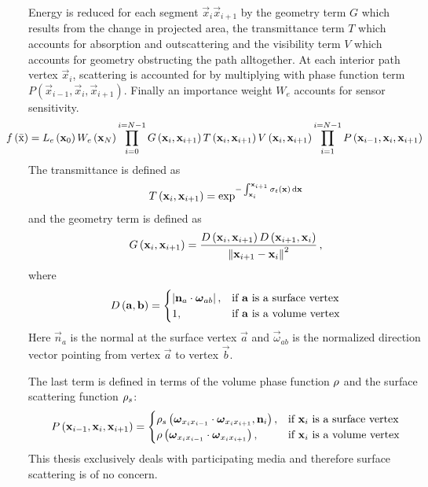 Energy is reduced for each segment $\vec{x}_i \vec{x}_{i+1}$ by the geometry term $G$ which results from the change in projected area, the transmittance term $T$ which accounts for absorption and outscattering and the visibility term $V$ which accounts for geometry obstructing the path alltogether. At each interior path vertex $\vec{x}_i$, scattering is accounted for by multiplying with phase function term $P(\vec{x}_{i-1}, \vec{x}_i, \vec{x}_{i+1})$. Finally an importance weight $W_e$ accounts for sensor sensitivity.
\begin{align}
\hspace{-.3in}
f\left(\bar{\mathrm{x}}\right) =
L_e\left(\vec{x}_0\right)
W_e\left(\vec{x}_N\right)
\prod_{i=0}^{i=N-1}
G\left(\vec{x}_i, \vec{x}_{i+1}\right)
T\left(\vec{x}_i, \vec{x}_{i+1}\right)
V\left(\vec{x}_i, \vec{x}_{i+1}\right)
\prod_{i=1}^{i=N-1}
P\left(\vec{x}_{i-1}, \vec{x}_i, \vec{x}_{i+1}\right)
\label{eq:foundations_mc_pathintegral}
\end{align}
The transmittance is defined as
\begin{align}
T\left(\boldsymbol{\mathbf{x}}_i, \boldsymbol{\mathbf{x}}_{i+1}\right) =
\operatorname{exp}^
{
    -\int_{\boldsymbol{\mathbf{x}}_i}^{\boldsymbol{\mathbf{x}}_{i+1}}\sigma_t\left(\boldsymbol{\mathbf{x}}\right)\,\mathrm{d}\boldsymbol{\mathbf{x}}
}
\end{align}
and the geometry term is defined as
\begin{align}
G\left(\boldsymbol{\mathbf{x}}_i, \boldsymbol{\mathbf{x}}_{i+1}\right) =
\frac{D\left(\boldsymbol{\mathbf{x}}_{i}, \boldsymbol{\mathbf{x}}_{i+1}\right)D\left(\boldsymbol{\mathbf{x}}_{i+1}, \boldsymbol{\mathbf{x}}_{i}\right)}{\left\lVert\boldsymbol{\mathbf{x}}_{i+1}-\boldsymbol{\mathbf{x}}_{i}\right\rVert^2} \,,
\end{align}
where
\begin{align}
D\left(\boldsymbol{\mathbf{a}}, \boldsymbol{\mathbf{b}}\right) =
\begin{cases}
\left\vert\boldsymbol{\mathbf{n}}_a\cdot\boldsymbol{\mathbf{\omega}}_{ab}\right\vert, & \text{if $\boldsymbol{\mathbf{a}}$ is a surface vertex}
\\
1, & \text{if $\boldsymbol{\mathbf{a}}$ is a volume vertex}
\end{cases}
\end{align}
Here $\vec{n}_a$ is the normal at the surface vertex $\vec{a}$ and $\vec{\omega}_{ab}$ is the normalized direction vector pointing from vertex $\vec{a}$ to vertex $\vec{b}$.

The last term is defined in terms of the volume phase function $\rho$ and the surface scattering function $\rho_s$:
\begin{align}
P\left(\boldsymbol{\mathbf{x}}_{i-1}, \boldsymbol{\mathbf{x}}_i, \boldsymbol{\mathbf{x}}_{i+1}\right) =
\begin{cases}
\rho_s\left(\boldsymbol{\mathbf{\omega}}_{x_ix_{i-1}}\cdot\boldsymbol{\mathbf{\omega}}_{x_ix_{i+1}}, \boldsymbol{\mathbf{n}}_i\right), & \text{if $\boldsymbol{\mathbf{x}}_i$ is a surface vertex}
\\
\rho\left(\boldsymbol{\mathbf{\omega}}_{x_ix_{i-1}}\cdot\boldsymbol{\mathbf{\omega}}_{x_ix_{i+1}}\right), & \text{if $\boldsymbol{\mathbf{x}}_i$ is a volume vertex}
\end{cases}
\end{align}
This thesis exclusively deals with participating media and therefore surface scattering is of no concern.

